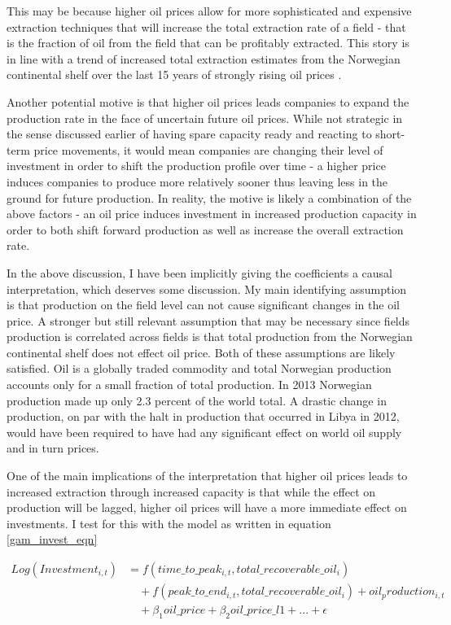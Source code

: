 \documentclass[12pt]{scrartcl} %
\begin{document}
This may be because higher oil prices allow for more sophisticated and expensive extraction techniques that will increase the total extraction rate of a field - that is the fraction of oil from the field that can be profitably extracted.  This story is in line with a trend of increased total extraction estimates from the Norwegian continental shelf over the last 15 years of strongly rising oil prices \citep{npd}.  

Another potential motive is that higher oil prices leads companies to expand the production rate in the face of uncertain future oil prices.  While not strategic in the sense discussed earlier of having spare capacity ready and reacting to short-term price movements, it would mean companies are changing their level of investment in order to shift the production profile over time - a higher price induces companies to produce more relatively sooner thus leaving less in the ground for future production.  In reality, the motive is likely a combination of the above factors - an oil price induces investment in increased production capacity in order to both shift forward production as well as increase the overall extraction rate.  

In the above discussion, I have been implicitly giving the coefficients a causal interpretation, which deserves some discussion.  My main identifying assumption is that production on the field level can not cause significant changes in the oil price.  A stronger but still relevant assumption that may be necessary since fields production is correlated across fields is that total production from the Norwegian continental shelf does not effect oil price.  Both of these assumptions are likely satisfied.  Oil is a globally traded commodity and total Norwegian production accounts only for a small fraction of total production.  In 2013 Norwegian production made up only 2.3 percent of the world total.  A drastic change in production, on par with the halt in production that occurred in Libya in 2012, would have been required to have had any significant effect on world oil supply and in turn prices.  

One of the main implications of the interpretation that higher oil prices leads to increased extraction through increased capacity is that while the effect on production will be lagged, higher oil prices will have a more immediate effect on investments.  I test for this with the model as written in equation \ref{gam_invest_eqn}

\begin{equation}
\begin{split}
	Log(Investment_{i,t})&=f(time\_to\_peak_{i,t}, total\_recoverable\_oil_i) \\
	& \quad + f(peak\_to\_end_{i,t}, total\_recoverable\_oil_i) + oil_production_{i,t} \\
	& \quad + \beta_1 oil\_price + \beta_2 oil\_price\_l1 + ... +  \epsilon
\end{split}
\label{gam_invest_eqn}
\end{equation}
\end{document}
